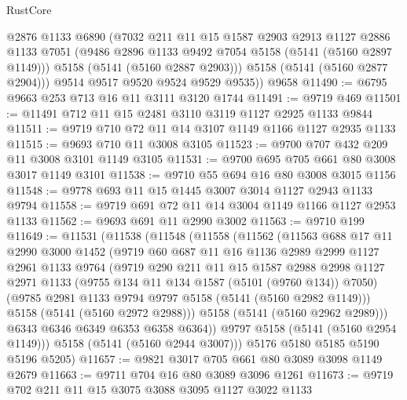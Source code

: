\begin{lexlean}{RustCore}
\begin{coremodule}
          @2876
          @1133
          @6890
          (@7032
            @211
            @11
            @15
            @1587
            @2903
            @2913
            @1127
            @2886
            @1133
            @7051
            (@9486 @2896 @1133 @9492 @7054 @5158 (@5141 (@5160 @2897 @1149)))
            @5158
            (@5141 (@5160 @2887 @2903)))
          @5158
          (@5141 (@5160 @2877 @2904)))
        @9514
        @9517
        @9520
        @9524
        @9529
        @9535))
    @9658
@11490 := @6795 @9663 @253 @713 @16 @11 @3111 @3120 @1744
@11491 := @9719 @469
@11501 := @11491 @712 @11 @15 @2481 @3110 @3119 @1127 @2925 @1133 @9844
@11511 := @9719 @710 @72 @11 @14 @3107 @1149 @1166 @1127 @2935 @1133
@11515 := @9693 @710 @11 @3008 @3105
@11523 := @9700 @707 @432 @209 @11 @3008 @3101 @1149 @3105
@11531 := @9700 @695 @705 @661 @80 @3008 @3017 @1149 @3101
@11538 := @9710 @55 @694 @16 @80 @3008 @3015 @1156
@11548 := @9778 @693 @11 @15 @1445 @3007 @3014 @1127 @2943 @1133 @9794
@11558 := @9719 @691 @72 @11 @14 @3004 @1149 @1166 @1127 @2953 @1133
@11562 := @9693 @691 @11 @2990 @3002
@11563 := @9710 @199
@11649 := @11531
    (@11538
      (@11548
        (@11558
          (@11562
            (@11563
              @688
              @17
              @11
              @2990
              @3000
              @1452
              (@9719
                @60
                @687
                @11
                @16
                @1136
                @2989
                @2999
                @1127
                @2961
                @1133
                @9764
                (@9719
                  @290
                  @211
                  @11
                  @15
                  @1587
                  @2988
                  @2998
                  @1127
                  @2971
                  @1133
                  (@9755 @134 @11 @134 @1587 (@5101 (@9760 @134)) @7050)
                  (@9785 @2981 @1133 @9794 @9797 @5158 (@5141 (@5160 @2982 @1149)))
                  @5158
                  (@5141 (@5160 @2972 @2988)))
                @5158
                (@5141 (@5160 @2962 @2989)))
              @6343
              @6346
              @6349
              @6353
              @6358
              @6364))
          @9797
          @5158
          (@5141 (@5160 @2954 @1149)))
        @5158
        (@5141 (@5160 @2944 @3007)))
      @5176
      @5180
      @5185
      @5190
      @5196
      @5205)
@11657 := @9821 @3017 @705 @661 @80 @3089 @3098 @1149 @2679
@11663 := @9711 @704 @16 @80 @3089 @3096 @1261
@11673 := @9719 @702 @211 @11 @15 @3075 @3088 @3095 @1127 @3022 @1133

\end{coremodule}
\end{lexlean}
